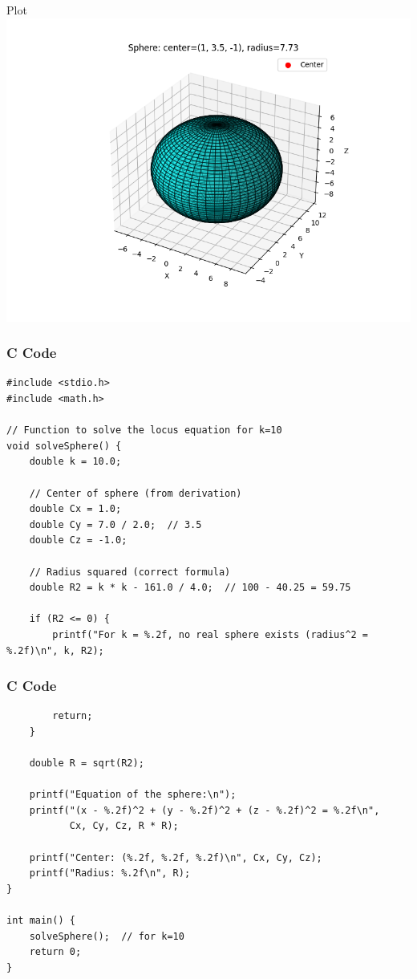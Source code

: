 \documentclass{beamer}
\begin{document}
\begin{frame}{Plot}
\centering
\includegraphics[height=0.6\textheight, keepaspectratio]{figs/fig1.png}
\end{frame}

\begin{frame}[fragile]
    \frametitle{C Code}
\begin{lstlisting}
#include <stdio.h>
#include <math.h>

// Function to solve the locus equation for k=10
void solveSphere() {
    double k = 10.0;

    // Center of sphere (from derivation)
    double Cx = 1.0;
    double Cy = 7.0 / 2.0;  // 3.5
    double Cz = -1.0;

    // Radius squared (correct formula)
    double R2 = k * k - 161.0 / 4.0;  // 100 - 40.25 = 59.75

    if (R2 <= 0) {
        printf("For k = %.2f, no real sphere exists (radius^2 = %.2f)\n", k, R2);
\end{lstlisting}
\end{frame}

\begin{frame}[fragile]
    \frametitle{C Code}
\begin{lstlisting}
        return;
    }

    double R = sqrt(R2);

    printf("Equation of the sphere:\n");
    printf("(x - %.2f)^2 + (y - %.2f)^2 + (z - %.2f)^2 = %.2f\n", 
           Cx, Cy, Cz, R * R);

    printf("Center: (%.2f, %.2f, %.2f)\n", Cx, Cy, Cz);
    printf("Radius: %.2f\n", R);
}

int main() {
    solveSphere();  // for k=10
    return 0;
}
\end{lstlisting}
\end{frame}
\end{document}
